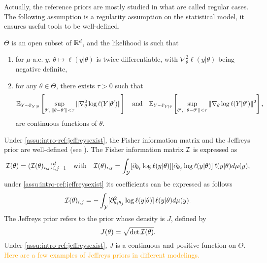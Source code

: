 Actually, the reference priors are mostly studied in what are called regular cases.
The following assumption is a regularity assumption on the statistical model, it ensures useful tools to be well-defined.
\begin{assu}\label{assu:intro-ref:jeffreysexist}
    $\Theta$ is an open subset of $\mathbb{R}^d$, and the likelihood is such that
    \begin{enumerate}
        \item for $\mu$-a.e. $y$, $\theta\mapsto\ell(y|\theta)$ is twice differentiable, with $\nabla^2_\theta\ell(y|\theta)$ being negative definite,
        \item for any $\theta\in\Theta$, there exists $\tau>0$ %
        such that %
        \begin{equation}
            \mathbb{E}_{Y\sim\mathbb{P}_{Y|\theta}}\left[\sup_{\theta',\,\|\theta-\theta'\|<\tau} \|\nabla^2_\theta\log\ell(Y|\theta')\| \right]\quad\text{and}\quad \mathbb{E}_{Y\sim\mathbb{P}_{Y|\theta}}\left[\sup_{\theta',\,\|\theta-\theta'\|<\tau}\|\nabla_\theta\log\ell(Y|\theta')\|^2\right],
        \end{equation}
        are continuous functions of $\theta$.
    \end{enumerate}
\end{assu}

Under \cref{assu:intro-ref:jeffreysexist}, the Fisher information matrix and the Jeffreys prior are well-defined (see \cite{lehmann_elements_1999}). The Fisher information matrix $\mathcal{I}$ is expressed as
    \begin{equation}
        \mathcal{I}(\theta) = (\mathcal{I}(\theta)_{i,j})_{i,j=1}^d\quad \text{with}\quad \mathcal{I}(\theta)_{i,j}= \int_{\mathcal{Y}}[\partial_{\theta_i}\log\ell(y|\theta)]
        [\partial_{\theta_j}\log\ell(y|\theta)]\, \ell(y|\theta)d\mu(y),
    \end{equation}
under \cref{assu:intro-ref:jeffreysexist} its coefficients can be expressed as follows
    \begin{equation}
       \mathcal{I}(\theta)_{i,j}= - \int_{\mathcal{Y}}[\partial^2_{\theta_i\theta_j}\log\ell(y|\theta)]\, \ell(y|\theta)d\mu(y).
    \end{equation}
The Jeffreys prior refers to the prior whose density is $J$, defined by
    \begin{equation}
        J(\theta) = \sqrt{\det\mathcal{I}(\theta)}.
    \end{equation}
Under \cref{assu:intro-ref:jeffreysexist}, $J$ is a continuous and positive function on $\Theta$. \textcolor{orange}{Here are a few examples of Jeffreys priors in different modelings.}

